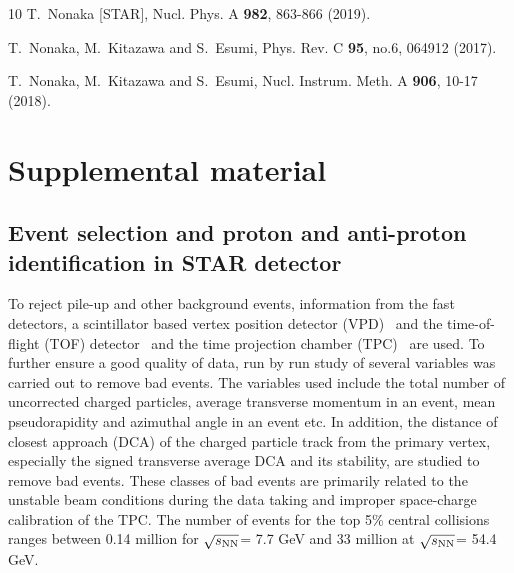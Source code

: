 \documentclass[10pt,aps,prc,twocolumn,floatfix]{revtex4-1}
\newcommand{\rootsnn} {\mbox{$\sqrt{s_{\rm NN}}$}\xspace}
\begin{document}
\begin{thebibliography}{10}
T.~Nonaka [STAR],
Nucl. Phys. A \textbf{982}, 863-866 (2019).

T.~Nonaka, M.~Kitazawa and S.~Esumi,
Phys. Rev. C \textbf{95}, no.6, 064912 (2017).


T.~Nonaka, M.~Kitazawa and S.~Esumi, 
Nucl. Instrum. Meth. A \textbf{906}, 10-17 (2018). 


\end{thebibliography}

\section{Supplemental material}



\subsection{ Event selection and proton and anti-proton identification in
  STAR detector}

To reject pile-up and 
other background events, information from the fast detectors, a scintillator based 
vertex position detector (VPD)~\cite{Llope:2003ti} and the time-of-flight (TOF)
detector~\cite{Llope:2003ti,Llope:2012zz} and the time projection chamber (TPC)~\cite{Anderson:2003ur} are
used. To further ensure a good quality of data, run
by run study of several 
variables was carried out to remove bad events. The variables
used include the total number of uncorrected charged particles,
average transverse momentum in an event,
mean pseudorapidity and azimuthal angle in an event etc. In addition,
the distance of closest approach (DCA) of the charged particle track
from the primary vertex, especially the signed transverse average DCA 
and its stability, are studied to remove bad events. These classes
of bad events are primarily related to the unstable beam conditions during the
data taking and improper space-charge calibration of the TPC.
The number of events for the top 5\% central collisions ranges between 0.14 million for
\rootsnn = 7.7 GeV and 33 million at \rootsnn = 54.4 GeV.
\end{document}
